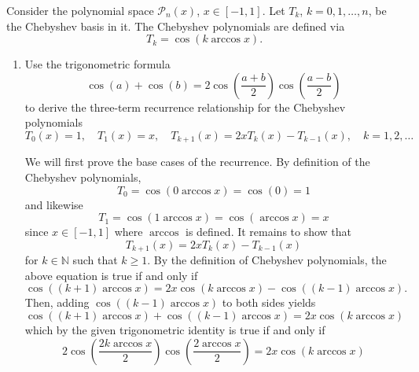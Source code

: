\documentclass{../../../kin_math}
\begin{document}
\begin{questions}
  \question Consider the polynomial space $\mathcal{P}_n(x)$, $x \in [-1, 1]$. Let $T_k$, $k = 0, 1, \dots, n$, be the Chebyshev basis in it. The Chebyshev polynomials are defined via
  \begin{equation*}
    T_k = \cos(k \arccos x).
  \end{equation*}
  \begin{enumerate}
    \item Use the trigonometric formula
    \begin{equation*}
      \cos(a) + \cos(b) = 2\cos\left(\frac{a + b}{2}\right)\cos\left(\frac{a - b}{2}\right)
    \end{equation*}
    to derive the three-term recurrence relationship for the Chebyshev polynomials
    \begin{equation}
      T_0(x) = 1, \quad T_1(x) = x, \quad T_{k + 1}(x) = 2xT_k(x) - T_{k - 1}(x), \quad k = 1, 2, \dots
    \end{equation}
    \begin{solution}
      We will first prove the base cases of the recurrence. By definition of the Chebyshev polynomials,
      \begin{equation*}
        T_0 = \cos(0 \arccos x) = \cos(0) = 1
      \end{equation*}
      and likewise
      \begin{equation*}
        T_1 = \cos(1 \arccos x) = \cos(\arccos x) = x
      \end{equation*}
      since $x \in [-1, 1]$ where $\arccos$ is defined. It remains to show that
      \begin{equation*}
        T_{k + 1}(x) = 2xT_k(x) - T_{k - 1}(x)
      \end{equation*}
      for $k \in \mathbb{N}$ such that $k \geq 1$. By the definition of Chebyshev polynomials, the above equation is true if and only if
      \begin{equation*}
        \cos((k + 1) \arccos x) = 2x \cos(k \arccos x) - \cos((k - 1) \arccos x).
      \end{equation*}
      Then, adding $\cos((k - 1) \arccos x)$ to both sides yields
      \begin{equation*}
        \cos((k + 1) \arccos x) + \cos((k - 1) \arccos x) = 2x \cos(k \arccos x)
      \end{equation*}
      which by the given trigonometric identity is true if and only if
      \begin{equation*}
        2\cos\left(\frac{2k \arccos x}{2}\right)\cos\left(\frac{2 \arccos x}{2}\right) = 2x\cos(k \arccos x)

\end{equation*}
\end{solution}
\end{enumerate}
\end{questions}
\end{document}
